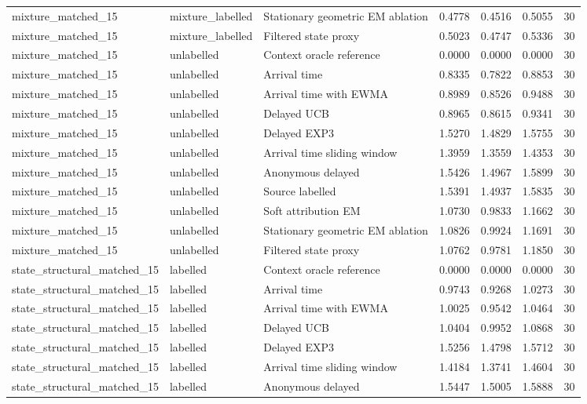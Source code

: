 \begin{tabular}{llllllr}
mixture\_matched\_15 & mixture\_labelled & Stationary geometric EM ablation & 0.4778 & 0.4516 & 0.5055 & 30 \\
mixture\_matched\_15 & mixture\_labelled & Filtered state proxy & 0.5023 & 0.4747 & 0.5336 & 30 \\
mixture\_matched\_15 & unlabelled & Context oracle reference & 0.0000 & 0.0000 & 0.0000 & 30 \\
mixture\_matched\_15 & unlabelled & Arrival time & 0.8335 & 0.7822 & 0.8853 & 30 \\
mixture\_matched\_15 & unlabelled & Arrival time with EWMA & 0.8989 & 0.8526 & 0.9488 & 30 \\
mixture\_matched\_15 & unlabelled & Delayed UCB & 0.8965 & 0.8615 & 0.9341 & 30 \\
mixture\_matched\_15 & unlabelled & Delayed EXP3 & 1.5270 & 1.4829 & 1.5755 & 30 \\
mixture\_matched\_15 & unlabelled & Arrival time sliding window & 1.3959 & 1.3559 & 1.4353 & 30 \\
mixture\_matched\_15 & unlabelled & Anonymous delayed & 1.5426 & 1.4967 & 1.5899 & 30 \\
mixture\_matched\_15 & unlabelled & Source labelled & 1.5391 & 1.4937 & 1.5835 & 30 \\
mixture\_matched\_15 & unlabelled & Soft attribution EM & 1.0730 & 0.9833 & 1.1662 & 30 \\
mixture\_matched\_15 & unlabelled & Stationary geometric EM ablation & 1.0826 & 0.9924 & 1.1691 & 30 \\
mixture\_matched\_15 & unlabelled & Filtered state proxy & 1.0762 & 0.9781 & 1.1850 & 30 \\
state\_structural\_matched\_15 & labelled & Context oracle reference & 0.0000 & 0.0000 & 0.0000 & 30 \\
state\_structural\_matched\_15 & labelled & Arrival time & 0.9743 & 0.9268 & 1.0273 & 30 \\
state\_structural\_matched\_15 & labelled & Arrival time with EWMA & 1.0025 & 0.9542 & 1.0464 & 30 \\
state\_structural\_matched\_15 & labelled & Delayed UCB & 1.0404 & 0.9952 & 1.0868 & 30 \\
state\_structural\_matched\_15 & labelled & Delayed EXP3 & 1.5256 & 1.4798 & 1.5712 & 30 \\
state\_structural\_matched\_15 & labelled & Arrival time sliding window & 1.4184 & 1.3741 & 1.4604 & 30 \\
state\_structural\_matched\_15 & labelled & Anonymous delayed & 1.5447 & 1.5005 & 1.5888 & 30 \\

\end{tabular}
